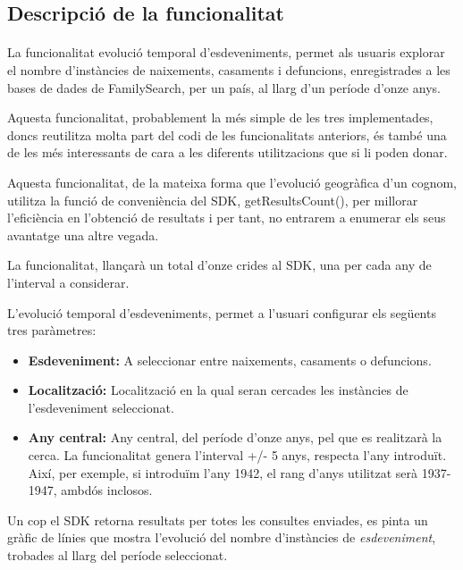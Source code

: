\subsection{Descripció de la funcionalitat}

\paragraph{}
La funcionalitat evolució temporal d'esdeveniments, permet als usuaris explorar el nombre d'instàncies de naixements, casaments i defuncions, enregistrades a les bases de dades de FamilySearch, per un país, al llarg d'un període d'onze anys.

Aquesta funcionalitat, probablement la més simple de les tres implementades, doncs reutilitza molta part del codi de les funcionalitats anteriors, és també una de les més interessants de cara a les diferents utilitzacions que si li poden donar.

Aquesta funcionalitat, de la mateixa forma que l'evolució geogràfica d'un cognom, utilitza la funció de conveniència del SDK, getResultsCount(), per millorar l’eficiència en l’obtenció de resultats i per tant, no entrarem a enumerar els seus avantatge una altre vegada.

La funcionalitat, llançarà un total d’onze crides al SDK, una per cada any de l’interval a considerar.

L'evolució temporal d'esdeveniments, permet a l'usuari configurar els següents tres paràmetres:

\begin{itemize}
    \item \textbf{Esdeveniment:} A seleccionar entre naixements, casaments o defuncions.
    \item \textbf{Localització:} Localització en la qual seran cercades les instàncies de l'esdeveniment seleccionat.
    \item \textbf{Any central:} Any central, del període d’onze anys, pel que es realitzarà la cerca. La funcionalitat genera l’interval +/- 5 anys, respecta l'any introduït. Així, per exemple, si introduïm l'any 1942, el rang d'anys utilitzat serà 1937-1947, ambdós inclosos.
\end{itemize}

Un cop el SDK retorna resultats per totes les consultes enviades, es pinta un gràfic de línies que mostra l'evolució del nombre d'instàncies de \emph{esdeveniment}, trobades al llarg del període seleccionat.
